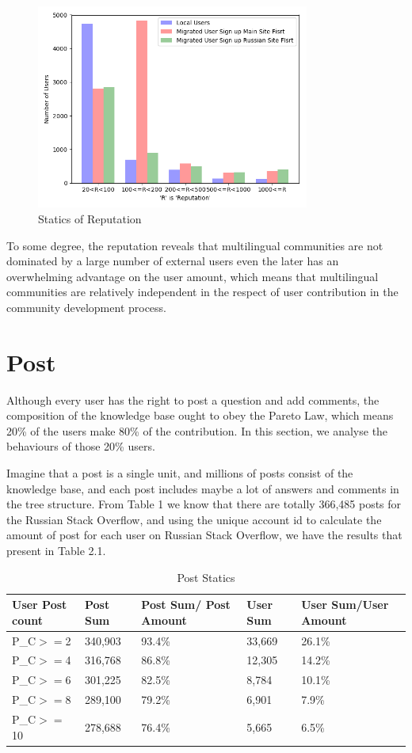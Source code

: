\begin{figure}[!h]
	\includegraphics[width = 0.80\textwidth]{figures/reputation.png}
	\caption{Statics of Reputation}
\end{figure}
To some degree, the reputation reveals that multilingual communities are not dominated by a large number of external users even the later has an overwhelming advantage on the user amount, which means that multilingual communities are relatively independent in the respect of user contribution in the community development process.


\section{Post}
Although every user has the right to post a question and add comments, the composition of the knowledge base ought to obey the Pareto Law, which means 20\% of the users make 80\% of the contribution. In this section, we analyse the behaviours of those 20\% users. \par

Imagine that a post is a single unit, and millions of posts consist of the knowledge base, and each post includes maybe a lot of answers and comments in the tree structure. From Table 1 we know that there are totally 366,485 posts for the Russian Stack Overflow, and using the unique account id to calculate the amount of post for each user on Russian Stack Overflow, we have the results that present in Table 2.1. 

\begin{table}[!h]
	\centering
	\caption{Post Statics}
	\label{tab:table2}
	\begin{tabular}{|p{2.2cm}|p{2.0cm}|p{2.0cm}|p{2.0cm}|p{2.0cm}|}
		User Post count & Post Sum &Post Sum/ Post Amount& User Sum &User Sum/User Amount \\
		\hline
		P\_C$>=$2 &340,903&93.4\%&33,669&26.1\%\\
		P\_C$>=$4 &316,768&86.8\%&12,305&14.2\%\\
		P\_C$>=$6 &301,225&82.5\%&8,784&10.1\%\\
		P\_C$>=$8 &289,100&79.2\%&6,901&7.9\%\\
		P\_C$>=$10&278,688&76.4\%&5,665&6.5\%\\
	\end{tabular}
\end{table}	

